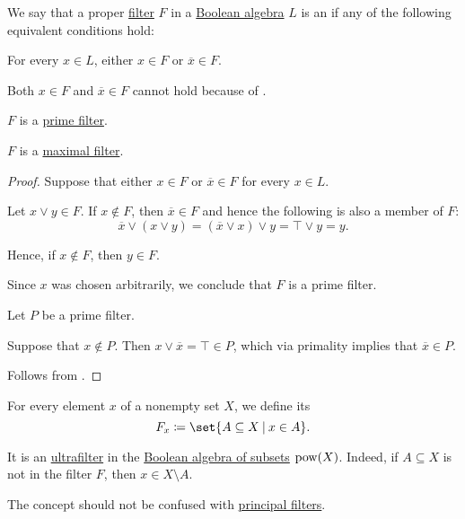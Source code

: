 \begin{definition}\label{def:ultrafilter}\mimprovised
  We say that a proper \hyperref[def:lattice_ideal/ideal]{filter} \( F \) in a \hyperref[def:boolean_algebra]{Boolean algebra} \( L \) is an  if any of the following equivalent conditions hold:
  \begin{thmenum}
     For every \( x \in L \), either \( x \in F \) or \( \overline x \in F \).

    Both \( x \in F \) and \( \overline x \in F \) cannot hold because of .

     \( F \) is a \hyperref[def:lattice_ideal/prime]{prime filter}.

     \( F \) is a \hyperref[def:lattice_ideal/maximal]{maximal filter}.
  \end{thmenum}
\end{definition}
\begin{proof}
   Suppose that either \( x \in F \) or \( \overline x \in F \) for every \( x \in L \).

  Let \( x \vee y \in F \). If \( x \not\in F \), then \( \overline x \in F \) and hence the following is also a member of \( F \):
  \begin{equation*}
    \overline x \vee (x \vee y)
    =
    (\overline x \vee x) \vee y
    =
    \top \vee y
    =
    y.
  \end{equation*}

  Hence, if \( x \not\in F \), then \( y \in F \).

  Since \( x \) was chosen arbitrarily, we conclude that \( F \) is a prime filter.

   Let \( P \) be a prime filter.

  Suppose that \( x \not\in P \). Then \( x \vee \overline x = \top \in P \), which via primality implies that \( \overline x \in P \).

   Follows from .
\end{proof}

\begin{example}\label{ex:principal_ultrafilter}
  For every element \( x \) of a nonempty set \( X \), we define its 
  \begin{equation*}
    F_x \coloneqq \set{ A \subseteq X \given x \in A }.
  \end{equation*}

  It is an \hyperref[def:ultrafilter]{ultrafilter} in the \hyperref[thm:boolean_algebra_of_subsets]{Boolean algebra of subsets} \( \operatorname{pow}(X) \). Indeed, if \( A \subseteq X \) is not in the filter \( F \), then \( x \in X \setminus A \).

  The concept should not be confused with \hyperref[def:lattice_ideal/principal]{principal filters}.
\end{example}

